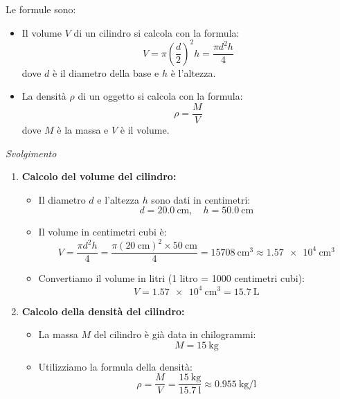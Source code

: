 Le formule sono:

\begin{itemize}
    \item Il volume \(V\) di un cilindro si calcola con la formula:
    \[
    V = \pi \left(\frac{d}{2}\right)^2 h = \frac{\pi d^2 h}{4}
    \]
    dove \(d\) è il diametro della base e \(h\) è l'altezza.

    \item La densità \(\rho\) di un oggetto si calcola con la formula:
    \[
    \rho = \frac{M}{V}
    \]
    dove \(M\) è la massa e \(V\) è il volume.
\end{itemize}

\textit{Svolgimento}\\

\begin{enumerate}
    \item \textbf{Calcolo del volume del cilindro:}

    \begin{itemize}
        \item Il diametro \(d\) e l'altezza \(h\) sono dati in centimetri:
        \[
        d = \SI{20,0}{\centi\metre}, \quad h = \SI{50,0}{\centi\metre}
        \]
        \item Il volume in centimetri cubi è:
        \[
        V = \frac{\pi d^2 h}{4} = \frac{\pi (\SI{20}{\centi\metre})^2 \times \SI{50}{\centi\metre}}{4} =  \SI{15708}{\centi\metre\cubed} \approx\SI{1,57e+4}{\centi\meter\cubed}
        \]
        \item Convertiamo il volume in litri (1 litro = 1000 centimetri cubi):
        \[
        V = \SI{1,57e+4}{\centi\meter\cubed} = \SI{15,7}{\liter}
        \]
    \end{itemize}

    \item \textbf{Calcolo della densità del cilindro:}

    \begin{itemize}
        \item La massa \(M\) del cilindro è già data in chilogrammi:
        \[
        M = \SI{15}{\kilogram}
        \]
        \item Utilizziamo la formula della densità:
        \[
        \rho = \frac{M}{V} = \frac{\SI{15}{\kilogram}}{\SI{15.7}{\litre}} \approx \SI{0.955}{\kilogram\per\litre}
        \]
    \end{itemize}
\end{enumerate}









